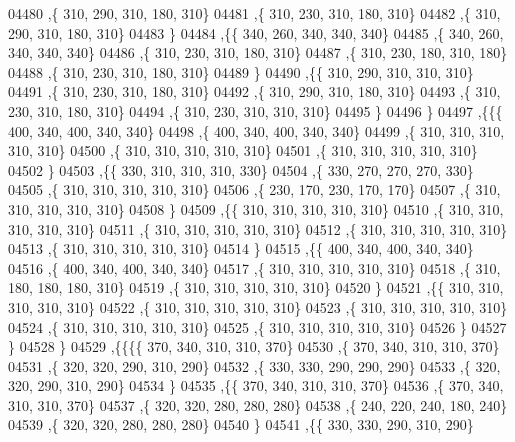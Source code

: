 \begin{DoxyCode}
04480     ,\{   310,   290,   310,   180,   310\}
04481     ,\{   310,   230,   310,   180,   310\}
04482     ,\{   310,   290,   310,   180,   310\}
04483     \}
04484    ,\{\{   340,   260,   340,   340,   340\}
04485     ,\{   340,   260,   340,   340,   340\}
04486     ,\{   310,   230,   310,   180,   310\}
04487     ,\{   310,   230,   180,   310,   180\}
04488     ,\{   310,   230,   310,   180,   310\}
04489     \}
04490    ,\{\{   310,   290,   310,   310,   310\}
04491     ,\{   310,   230,   310,   180,   310\}
04492     ,\{   310,   290,   310,   180,   310\}
04493     ,\{   310,   230,   310,   180,   310\}
04494     ,\{   310,   230,   310,   310,   310\}
04495     \}
04496    \}
04497   ,\{\{\{   400,   340,   400,   340,   340\}
04498     ,\{   400,   340,   400,   340,   340\}
04499     ,\{   310,   310,   310,   310,   310\}
04500     ,\{   310,   310,   310,   310,   310\}
04501     ,\{   310,   310,   310,   310,   310\}
04502     \}
04503    ,\{\{   330,   310,   310,   310,   330\}
04504     ,\{   330,   270,   270,   270,   330\}
04505     ,\{   310,   310,   310,   310,   310\}
04506     ,\{   230,   170,   230,   170,   170\}
04507     ,\{   310,   310,   310,   310,   310\}
04508     \}
04509    ,\{\{   310,   310,   310,   310,   310\}
04510     ,\{   310,   310,   310,   310,   310\}
04511     ,\{   310,   310,   310,   310,   310\}
04512     ,\{   310,   310,   310,   310,   310\}
04513     ,\{   310,   310,   310,   310,   310\}
04514     \}
04515    ,\{\{   400,   340,   400,   340,   340\}
04516     ,\{   400,   340,   400,   340,   340\}
04517     ,\{   310,   310,   310,   310,   310\}
04518     ,\{   310,   180,   180,   180,   310\}
04519     ,\{   310,   310,   310,   310,   310\}
04520     \}
04521    ,\{\{   310,   310,   310,   310,   310\}
04522     ,\{   310,   310,   310,   310,   310\}
04523     ,\{   310,   310,   310,   310,   310\}
04524     ,\{   310,   310,   310,   310,   310\}
04525     ,\{   310,   310,   310,   310,   310\}
04526     \}
04527    \}
04528   \}
04529  ,\{\{\{\{   370,   340,   310,   310,   370\}
04530     ,\{   370,   340,   310,   310,   370\}
04531     ,\{   320,   320,   290,   310,   290\}
04532     ,\{   330,   330,   290,   290,   290\}
04533     ,\{   320,   320,   290,   310,   290\}
04534     \}
04535    ,\{\{   370,   340,   310,   310,   370\}
04536     ,\{   370,   340,   310,   310,   370\}
04537     ,\{   320,   320,   280,   280,   280\}
04538     ,\{   240,   220,   240,   180,   240\}
04539     ,\{   320,   320,   280,   280,   280\}
04540     \}
04541    ,\{\{   330,   330,   290,   310,   290\}

\end{DoxyCode}
